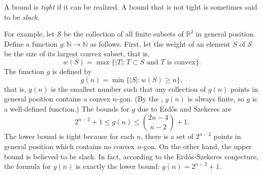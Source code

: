 \documentclass[12pt]{article}
\begin{document}
A bound is \emph{tight} if it can be realized.  A bound that is not
tight is sometimes said to be \emph{slack}.

For example, let $\mathcal{S}$ be the collection of all finite subsets
of $\mathbb{R}^2$ in general position.  Define a function
$g\colon\mathbb{N}\to\mathbb{N}$ as follows.  First, let the weight of
an element $S$ of $\mathcal{S}$ be the size of its largest convex subset,
that is, 
\[
w(S) = \max \{ |T| \colon T\subset S\text{\ and $T$ is convex} \}.
\]
The function $g$ is defined by
\[
g(n) = \min \{ |S| \colon w(S) \ge n\},
\]
that is, $g(n)$ is the smallest number such that any collection of
$g(n)$ points in general position contains a convex $n$-gon.  (By the
, $g(n)$ is 
always finite, so $g$ is a well-defined function.)  The bounds for $g$ 
due to Erd\H{o}s and Szekeres are
\[
2^{n-2} + 1\le g(n) \le \binom{2n-4}{n-2} + 1.
\]
The lower bound is tight because for each $n$, there is a set of
$2^{n-2}$ points in general position which contains no convex $n$-gon.
On the other hand, the upper bound is believed to be slack.  In fact, 
according to the Erd\H{o}s-Szekeres conjecture, the formula for $g(n)$ 
is exactly the lower bound: $g(n) = 2^{n-2} + 1$.

\end{document}
